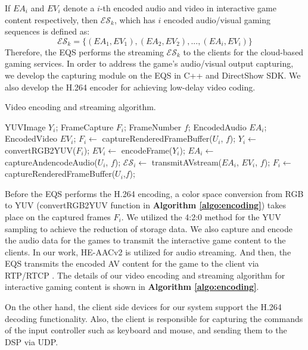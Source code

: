 \documentclass[conference]{IEEEtran}
\begin{document}
    If $EA_i$ and $EV_i$ denote a $i$-th encoded audio and video in interactive game content respectively,
    then $\mathcal{ES}_k$, which has $i$ encoded audio/visual gaming sequences is defined as:
    $$ \mathcal{ES}_k = \{(EA_1, EV_1), (EA_2, EV_2), ... , (EA_i, EV_i) \} $$
    Therefore, the EQS performs the streaming $ \mathcal{ES}_k$ to the clients for the cloud-based gaming services.
    In order to  address the game's audio/visual output capturing, we develop the capturing module on the EQS in C++ and DirectShow SDK.
    We also develop the H.264 encoder for achieving low-delay video coding.
    \begin{algorithm}
    \caption{Video encoding and streaming algorithm.}
    \label{algo:encoding}
    \begin{algorithmic}[1]
       \State YUVImage $Y_i$;
       \State FrameCapture $F_i$;
       \State FrameNumber $f$;
       \State EncodedAudio $EA_i$;
       \State EncodedVideo $EV_i$;
       \State $F_i \gets$ captureRenderedFrameBuffer($U_i$, $f$); \label{state:capture}
            \State $Y_i \gets$ convertRGB2YUV($F_i$);
            \State $EV_i \gets$ encodeFrame($Y_i$);
            \State $EA_i \gets$ captureAndencodeAudio($U_i$, $f$);
            \State $\mathcal{ES}_i \gets$ transmitAVstream($EA_i$, $EV_i$, $f$);
            \State $F_i \gets$ captureRenderedFrameBuffer($U_i$,$f$);
       \EndWhile
    \EndProcedure
    \end{algorithmic}
    \end{algorithm}
    Before the EQS performs the H.264 encoding, a color space conversion from RGB to YUV (convertRGB2YUV function in \textbf{Algorithm \ref{algo:encoding}}) takes place on the captured frames $F_i$. We utilized the 4:2:0 method for the YUV sampling to achieve the reduction of storage data.
    We also capture and encode the audio data for the games to transmit the interactive game content to the clients. In our work, HE-AACv2 is utilized for audio streaming. And then, the EQS transmits the encoded AV content for the game to the client via RTP/RTCP \cite{RTP84}. The details of our video encoding and streaming algorithm for interactive gaming content is shown in \textbf{Algorithm \ref{algo:encoding}}.

    On the other hand, the client side devices for our system support the H.264 decoding functionality.
    Also, the client is responsible for capturing the commands of the input controller such as keyboard and mouse, and sending them to the DSP via UDP.
\end{document}
